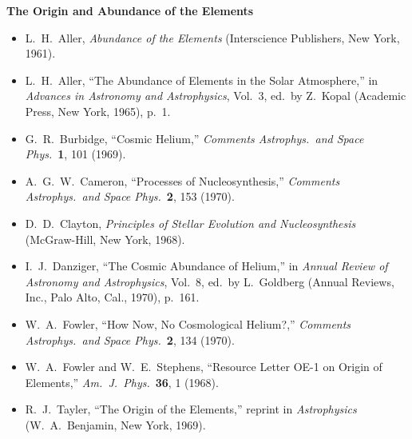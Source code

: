\medskip
\noindent\textbf{The Origin and Abundance of the Elements}\par
\begin{itemize}
  \item[\(\square\)] L.~H.~Aller, \emph{Abundance of the Elements}
  (Interscience Publishers, New York, 1961).

  \item[\(\square\)] L.~H.~Aller,
  ``The Abundance of Elements in the Solar Atmosphere,'' in
  \emph{Advances in Astronomy and Astrophysics}, Vol.~3,
  ed.\ by Z.~Kopal (Academic Press, New York, 1965), p.~1.

  \item[\(\square\)] G.~R.~Burbidge, ``Cosmic Helium,''
  \emph{Comments Astrophys.\ and Space Phys.}\ \textbf{1}, 101 (1969).

  \item[\(\square\)] A.~G.~W.~Cameron, ``Processes of Nucleosynthesis,''
  \emph{Comments Astrophys.\ and Space Phys.}\ \textbf{2}, 153 (1970).

  \item[\(\square\)] D.~D.~Clayton,
  \emph{Principles of Stellar Evolution and Nucleosynthesis}
  (McGraw-Hill, New York, 1968).

  \item[\(\square\)] I.~J.~Danziger,
  ``The Cosmic Abundance of Helium,'' in
  \emph{Annual Review of Astronomy and Astrophysics}, Vol.~8,
  ed.\ by L.~Goldberg (Annual Reviews, Inc., Palo Alto, Cal., 1970), p.~161.

  \item[\(\square\)] W.~A.~Fowler,
  ``How Now, No Cosmological Helium?,''
  \emph{Comments Astrophys.\ and Space Phys.}\ \textbf{2}, 134 (1970).

  \item[\(\square\)] W.~A.~Fowler and W.~E.~Stephens,
  ``Resource Letter OE-1 on Origin of Elements,''
  \emph{Am.\ J.\ Phys.}\ \textbf{36}, 1 (1968).

  \item[\(\square\)] R.~J.~Tayler, ``The Origin of the Elements,'' reprint
  in \emph{Astrophysics} (W.~A.~Benjamin, New York, 1969).
\end{itemize}

